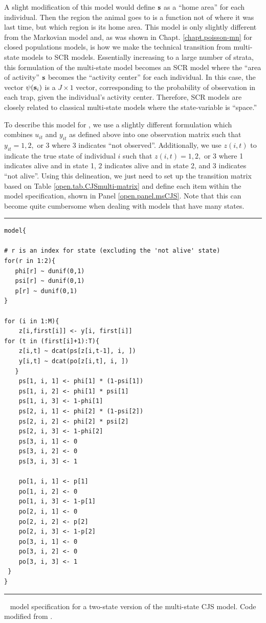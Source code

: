 A slight modification of this model would define ${\bf s}$ as a ``home
area'' for each individual. Then the region the animal goes to is a
function not of where it was last time, but which region is its home
area.  This model is only slightly different from the Markovian model
and, as was shown in Chapt. \ref{chapt.poisson-mn} for closed
populations models, is how we make the technical transition from
multi-state models to SCR models.  Essentially increasing to a large
number of strata, this formulation of the multi-state model becomes an
SCR model where the ``area of activity'' ${\bf s}$ becomes the
``activity center'' for each individual. In this case, the vector
$\psi({\bf s}_{i})$ is a $J \times 1$ vector, corresponding to the
probability of observation in each trap, given the individual's
activity center.  Therefore, SCR models are closely related to
classical multi-state models where the state-variable is ``space.''

To describe this model for \jags, we use a slightly different
formulation which combines $u_{it}$ and $y_{it}$ as defined above into
one observation matrix such that $y_{it} = 1, 2,$ or $3$ where 3
indicates ``not observed''.  Additionally, we use $z(i,t)$ to indicate
the true state of individual $i$ such that $z(i,t) = 1, 2,$ or $3$
where 1 indicates alive and in state 1, 2 indicates alive and in state
2, and 3 indicates ``not alive''.  Using this delineation, we just
need to set up the transition matrix based on Table
\ref{open.tab.CJSmulti-matrix} and define each item within the model
specification, shown in Panel \ref{open.panel.msCJS}.  Note that this
can become quite cumbersome when dealing with models that have many
states.


\begin{panel}[htp]
\centering
\rule[0.1in]{\textwidth}{.03in}
{\small
\begin{verbatim}
model{

# r is an index for state (excluding the 'not alive' state)
for(r in 1:2){
   phi[r] ~ dunif(0,1)
   psi[r] ~ dunif(0,1)
   p[r] ~ dunif(0,1)
}    

for (i in 1:M){
    z[i,first[i]] <- y[i, first[i]]
for (t in (first[i]+1):T){
    z[i,t] ~ dcat(ps[z[i,t-1], i, ])
    y[i,t] ~ dcat(po[z[i,t], i, ])
   }
	ps[1, i, 1] <- phi[1] * (1-psi[1])
	ps[1, i, 2] <- phi[1] * psi[1]
	ps[1, i, 3] <- 1-phi[1]
	ps[2, i, 1] <- phi[2] * (1-psi[2])
	ps[2, i, 2] <- phi[2] * psi[2]
	ps[2, i, 3] <- 1-phi[2]
	ps[3, i, 1] <- 0
	ps[3, i, 2] <- 0
	ps[3, i, 3] <- 1

	po[1, i, 1] <- p[1]
	po[1, i, 2] <- 0
	po[1, i, 3] <- 1-p[1]
	po[2, i, 1] <- 0
	po[2, i, 2] <- p[2]
	po[2, i, 3] <- 1-p[2]
	po[3, i, 1] <- 0
	po[3, i, 2] <- 0
	po[3, i, 3] <- 1
 }
}
\end{verbatim}
}
\rule[-0.1in]{\textwidth}{.03in}
\caption{
\jags~ model specification for a two-state version of the multi-state
CJS model. Code modified 
from \cite[][Chapt. 9]{kery_schaub:2011}. }
\label{open.panel.msCJS}
\end{panel}

